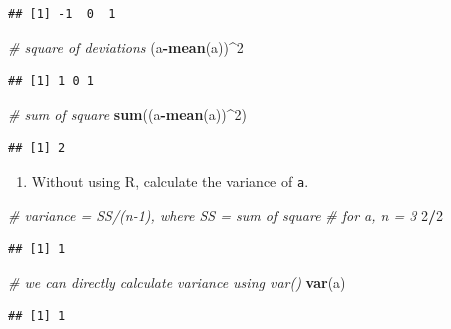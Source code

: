 \documentclass[]{book}
\newenvironment{Shaded}{\begin{snugshade}}{\end{snugshade}}
\newcommand{\CommentTok}[1]{\textcolor[rgb]{0.56,0.35,0.01}{\textit{#1}}}
\newcommand{\DecValTok}[1]{\textcolor[rgb]{0.00,0.00,0.81}{#1}}
\newcommand{\KeywordTok}[1]{\textcolor[rgb]{0.13,0.29,0.53}{\textbf{#1}}}
\newcommand{\NormalTok}[1]{#1}
\newcommand{\OperatorTok}[1]{\textcolor[rgb]{0.81,0.36,0.00}{\textbf{#1}}}
\providecommand{\tightlist}{%
  \setlength{\itemsep}{0pt}\setlength{\parskip}{0pt}}
\begin{document}
\begin{verbatim}
## [1] -1  0  1
\end{verbatim}

\begin{Shaded}
\begin{Highlighting}[]
\CommentTok{# square of deviations}
\NormalTok{(a}\OperatorTok{-}\KeywordTok{mean}\NormalTok{(a))}\OperatorTok{^}\DecValTok{2}
\end{Highlighting}
\end{Shaded}

\begin{verbatim}
## [1] 1 0 1
\end{verbatim}

\begin{Shaded}
\begin{Highlighting}[]
\CommentTok{# sum of square }
\KeywordTok{sum}\NormalTok{((a}\OperatorTok{-}\KeywordTok{mean}\NormalTok{(a))}\OperatorTok{^}\DecValTok{2}\NormalTok{)}
\end{Highlighting}
\end{Shaded}

\begin{verbatim}
## [1] 2
\end{verbatim}

\begin{enumerate}
\def\labelenumi{\arabic{enumi}.}
\setcounter{enumi}{1}
\tightlist
\item
  Without using R, calculate the variance of \texttt{a}.
\end{enumerate}

\begin{Shaded}
\begin{Highlighting}[]
\CommentTok{# variance = SS/(n-1), where SS = sum of square}
\CommentTok{# for a, n = 3}
\DecValTok{2}\OperatorTok{/}\DecValTok{2}
\end{Highlighting}
\end{Shaded}

\begin{verbatim}
## [1] 1
\end{verbatim}

\begin{Shaded}
\begin{Highlighting}[]
\CommentTok{# we can directly calculate variance using var()}
\KeywordTok{var}\NormalTok{(a)}
\end{Highlighting}
\end{Shaded}

\begin{verbatim}
## [1] 1
\end{verbatim}
\end{document}

